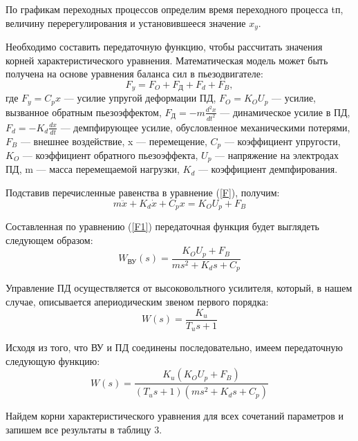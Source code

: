 \documentclass[12pt, a4paper]{article}
\begin{document}
\par По графикам переходных процессов определим время переходного процесса tп, величину перерегулирования  и 
установившееся значение $x_{y}$. 

\par  Необходимо составить передаточную функцию, чтобы рассчитать значения корней характеристического уравнения.
Математическая модель может быть получена на основе уравнения баланса сил в пьезодвигателе:  
\begin{equation} 
    F_y = F_O + F_\text{Д} + F_d + F_B,
    \label{F}
\end{equation}
где $F_y=C_px$ --- усилие упругой деформации ПД, $F_O=K_OU_p$ --- усилие, вызванное обратным пьезоэффектом, $F_\text{Д}=-m\displaystyle{\frac{d^2x}{dt^2}}$ --- динамическое усилие в ПД, $F_d=-K_d\displaystyle{\frac{dx}{dt}}$ --- демпфирующее усилие, обусловленное механическими потерями, $F_B$ --- внешнее воздействие, x --- перемещение, $C_p$ --- коэффициент упругости, $K_O$ --- коэффициент обратного пьезоэффекта, $U_p$ --- напряжение на электродах ПД, m --- масса перемещаемой нагрузки, $K_d$ --- коэффициент демпфирования.\par
Подставив перечисленные равенства в уравнение (\ref{F}), получим:
\begin{equation} 
    m\ddot{x} + K_d\dot{x} + C_px = K_OU_p + F_B
    \label{F1}
\end{equation}
\par Составленная по уравнению (\ref{F1}) передаточная функция будет выглядеть следующем образом:
\begin{equation} 
    W_{\text{ВУ}}(s)=\frac{K_OU_p + F_B}{ms^2 + K_ds + C_p}
    \label{FVU}
\end{equation}
\par Управление ПД осуществляется от высоковольтного усилителя, который, в нашем случае, описывается апериодическим звеном первого порядка:
\begin{equation} 
    W(s)=\frac{K_u}{T_us + 1}
\end{equation}
\par Исходя из того, что ВУ и ПД соединены последовательно, имеем передаточную следующую функцию:
\begin{equation} 
    W(s)=\frac{K_u(K_OU_p + F_B)}{(T_us + 1)(ms^2 + K_ds + C_p)}
\end{equation}
\par Найдем корни характеристического уравнения для всех сочетаний параметров и запишем все результаты в таблицу 3.
\end{document}
